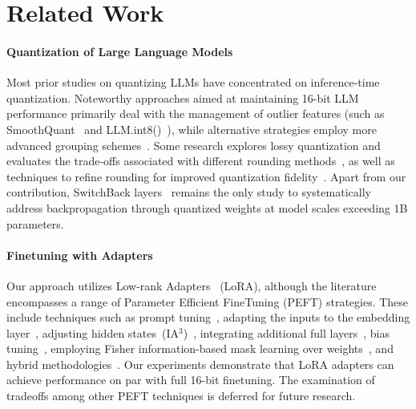 \section{Related Work}

\paragraph{Quantization of Large Language Models} Most prior studies on quantizing LLMs have concentrated on inference-time quantization. Noteworthy approaches aimed at maintaining 16-bit LLM performance primarily deal with the management of outlier features (such as SmoothQuant~\citep{xiao2022smoothquant} and LLM.int8()~\citep{dettmers2022llm}), while alternative strategies employ more advanced grouping schemes~\citep{park2022nuqmm, yao2022zeroquant}. Some research explores lossy quantization and evaluates the trade-offs associated with different rounding methods~\citep{dettmers2022case,zeng2022glm,pope2022efficiently}, as well as techniques to refine rounding for improved quantization fidelity~\citep{frantar2022gptq}. Apart from our contribution, SwitchBack layers~\citep{wortsman2023stable} remains the only study to systematically address backpropagation through quantized weights at model scales exceeding 1B parameters.

\paragraph{Finetuning with Adapters} Our approach utilizes Low-rank Adapters~\citep{hu2021lora} (LoRA), although the literature encompasses a range of Parameter Efficient FineTuning (PEFT) strategies. These include techniques such as prompt tuning~\citep{qin2021learning,lester2021power,li2021prefix}, adapting the inputs to the embedding layer~\citep{an2022input}, adjusting hidden states~(IA$^3$)~\citep{liu2022few}, integrating additional full layers~\citep{houlsby2019parameter}, bias tuning~\citep{zaken2021bitfit}, employing Fisher information-based mask learning over weights~\citep{sung2021training}, and hybrid methodologies~\citep{henderson2021compacter}. Our experiments demonstrate that LoRA adapters can achieve performance on par with full 16-bit finetuning. The examination of tradeoffs among other PEFT techniques is deferred for future research.

